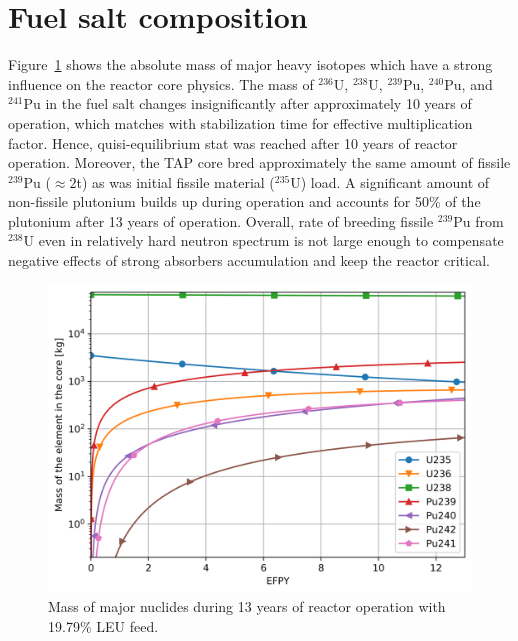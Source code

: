 \documentclass[12pt]{article} %
\begin{document}
\section{Fuel salt composition}
Figure~\ref{fig:u-pu} shows the absolute mass of major heavy isotopes 
which have a strong influence on the reactor core physics. The mass of 
$^{236}$U, $^{238}$U, $^{239}$Pu, $^{240}$Pu, and $^{241}$Pu in the 
fuel salt changes insignificantly after approximately 10 years of operation,
which matches with stabilization time for effective multiplication factor. 
Hence, quisi-equilibrium stat was reached after 10 years of reactor 
operation. Moreover, the \gls{TAP} core bred approximately the same amount 
of fissile $^{239}$Pu ($\approx2$t) as was initial fissile material 
($^{235}$U) load. A significant amount of non-fissile plutonium builds 
up during operation and accounts for 50\% of the plutonium after 13 years 
of operation. Overall, rate of breeding fissile $^{239}$Pu from $^{238}$U 
even in relatively hard neutron spectrum is not large enough to compensate 
negative effects of strong absorbers accumulation and keep the reactor 
critical.
\begin{figure}[htp!] %
  \centering
		  \includegraphics[width=\textwidth]{u_pu_mass.png}
	 \vspace{-0.35in}
  \caption{Mass of major nuclides during 13 years of reactor operation 
  with 19.79\% \gls{LEU} feed.}
  \label{fig:u-pu}
\end{figure}
\end{document}
